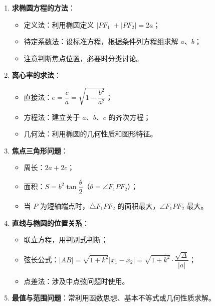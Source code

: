 \documentclass[11pt]{ctexrep}
\begin{document}
\begin{enumerate}
    \item \textbf{求椭圆方程的方法}：
    \begin{itemize}
        \item 定义法：利用椭圆定义 $|PF_1| + |PF_2| = 2a$；
        \item 待定系数法：设标准方程，根据条件列方程组求解 $a$、$b$；
        \item 注意判断焦点位置，必要时分类讨论。
    \end{itemize}
    \item \textbf{离心率的求法}：
    \begin{itemize}
        \item 直接法：$e = \dfrac{c}{a} = \sqrt{1 - \dfrac{b^2}{a^2}}$；
        \item 方程法：建立关于 $a$、$b$、$c$ 的齐次方程；
        \item 几何法：利用椭圆的几何性质和图形特征。
    \end{itemize}
    \item \textbf{焦点三角形问题}：
    \begin{itemize}
        \item 周长：$2a + 2c$；
        \item 面积：$S = b^2\tan\dfrac{\theta}{2}$（$\theta = \angle F_1PF_2$）；
        \item 当 $P$ 为短轴端点时，$\triangle F_1PF_2$ 的面积最大，$\angle F_1PF_2$ 最大。
    \end{itemize}
    \item \textbf{直线与椭圆的位置关系}：
    \begin{itemize}
        \item 联立方程，用判别式判断；
        \item 弦长公式：$|AB| = \sqrt{1 + k^2}|x_1 - x_2| = \sqrt{1 + k^2}\cdot\dfrac{\sqrt{\Delta}}{|a|}$；
        \item 点差法：涉及中点弦问题时使用。
    \end{itemize}
    \item \textbf{最值与范围问题}：常利用函数思想、基本不等式或几何性质求解。
\end{enumerate}
\end{document}
